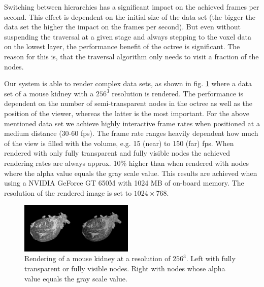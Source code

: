 \documentclass[12pt,conference]{IEEEtran}
\begin{document}
Switching between hierarchies has a significant impact on the achieved frames per second. This effect is dependent on the initial size of the data set (the bigger the data set the higher the impact on the frames per second). But even without suspending the traversal at a given stage and always stepping to the voxel data on the lowest layer, the performance benefit of the octree is significant. The reason for this is, that the traversal algorithm only needs to visit a fraction of the nodes.
\par
Our system is able to render complex data sets, as shown in fig. \ref{fig:kidneyRendering} where a data set of a mouse kidney with a $256^3$ resolution is rendered. The performance is dependent on the number of semi-transparent nodes in the octree as well as the position of the viewer, whereas the latter is the most important. For the above mentioned data set we achieve highly interactive frame rates when positioned at a medium distance (30-60 fps). The frame rate ranges heavily dependent how much of the view is filled with the volume, e.g. 15 (near) to 150 (far) fps. When rendered with only fully transparent and fully visible nodes the achieved rendering rates are always approx. 10\% higher than when rendered with nodes where the alpha value equals the gray scale value.
This results are achieved when using a NVIDIA GeForce GT 650M with 1024 MB of on-board memory. The resolution of the rendered image is set to $1024\times 768$.

\begin{figure}[htp]
	\centering
	\includegraphics[width=0.48\textwidth, trim={0.5cm 2.5cm 0.5cm 2cm}, clip]{images/kidney_256x256x256.PNG}
	\caption{Rendering of a mouse kidney at a resolution of $256^3$. Left with fully transparent or fully visible nodes. Right with nodes whose alpha value equals the gray scale value.}
	\label{fig:kidneyRendering}
\end{figure}
\end{document}
